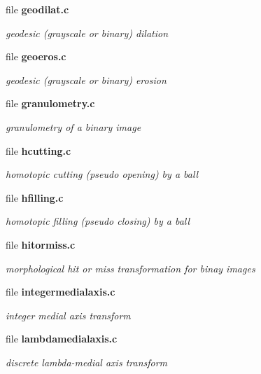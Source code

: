 \begin{CompactItemize}
\item 
file {\bf geodilat.c}
\begin{CompactList}\small\item\em geodesic (grayscale or binary) dilation \item\end{CompactList}

\item 
file {\bf geoeros.c}
\begin{CompactList}\small\item\em geodesic (grayscale or binary) erosion \item\end{CompactList}

\item 
file {\bf granulometry.c}
\begin{CompactList}\small\item\em granulometry of a binary image \item\end{CompactList}

\item 
file {\bf hcutting.c}
\begin{CompactList}\small\item\em homotopic cutting (pseudo opening) by a ball \item\end{CompactList}

\item 
file {\bf hfilling.c}
\begin{CompactList}\small\item\em homotopic filling (pseudo closing) by a ball \item\end{CompactList}

\item 
file {\bf hitormiss.c}
\begin{CompactList}\small\item\em morphological hit or miss transformation for binay images \item\end{CompactList}

\item 
file {\bf integermedialaxis.c}
\begin{CompactList}\small\item\em integer medial axis transform \item\end{CompactList}

\item 
file {\bf lambdamedialaxis.c}
\begin{CompactList}\small\item\em discrete lambda-medial axis transform \item\end{CompactList}


\end{CompactItemize}
